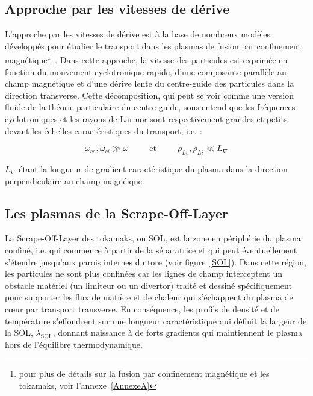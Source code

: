 \begin{refsection}
\section{Approche par les vitesses de dérive}
\label{vitessesDerive}
L'approche par les vitesses de dérive est à la base de nombreux modèles
développés pour étudier le transport dans les plasmas de fusion par
confinement magnétique\footnote{pour plus de détails sur la fusion par
confinement magnétique et les tokamaks, voir
l'annexe~\ref{AnnexeA}}~\parencite{Garcia,Bisai,Tamain}. Dans cette approche, la vitesse des particules est exprimée en fonction du mouvement cyclotronique rapide, d'une composante
parallèle au champ magnétique et d'une dérive lente du centre-guide des particules dans
la direction transverse. Cette décomposition, qui peut se voir comme une
version fluide de la théorie particulaire du centre-guide, sous-entend que les
fréquences cyclotroniques et les rayons de Larmor sont respectivement grandes
et petits devant les échelles caractéristiques du transport, i.e. :

\begin{equation}
\omega_{ce},\omega_{ci}\gg\omega\;\;\;\;\;\;\;\;\;\text{et}\;\;\;\;\;\;\;\;\;\rho_{Le},\rho_{Li}\ll
L_\nabla \end{equation} 

$L_\nabla$ étant la longueur de gradient caractéristique du
plasma dans la direction perpendiculaire au champ magnéique. 
 
\subsection{Les plasmas de la Scrape-Off-Layer}
La Scrape-Off-Layer des tokamaks, ou SOL, est la zone en périphérie du
plasma confiné, i.e.
qui commence à partir de la séparatrice et qui peut éventuellement s'étendre jusqu'aux parois internes du tore (voir
figure~\ref{SOL}). Dans cette région, les
particules ne sont plus confinées car les lignes de champ interceptent un
obstacle matériel (un limiteur ou un divertor) traité et dessiné spécifiquement
pour supporter les flux de matière et de chaleur qui s'échappent du plasma de
c\oe ur par transport transverse.
En conséquence, les profils de densité et de température s'effondrent sur une
longueur caractéristique qui définit la largeur de la SOL, $\lambda_\text{SOL}$,
donnant naissance à de forts gradients qui maintiennent le plasma hors
de l'équilibre thermodynamique.


\end{refsection}
